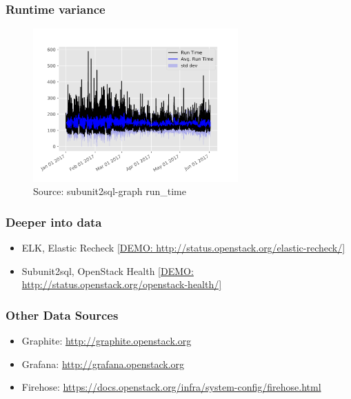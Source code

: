 \documentclass[aspectratio=169,11pt,hyperref={colorlinks=true}]{beamer}
\begin{document}

\begin{frame}
    \frametitle{Runtime variance}
    \begin{figure}
    \begin{center}
    	\includegraphics[width=0.7\textwidth]{runtime_variance.png}
         \caption{Source: subunit2sql-graph run\_time}
    \end{center}
    \end{figure}
\end{frame}


\begin{frame}
    \frametitle{Deeper into data}
    \begin{itemize}
        \item{ELK, Elastic Recheck \href{http://status.openstack.org/elastic-recheck/}{[DEMO: http://status.openstack.org/elastic-recheck/]}}
        \item{Subunit2sql, OpenStack Health \href{http://status.openstack.org/openstack-health/\#/}{[DEMO: http://status.openstack.org/openstack-health/]}}
    \end{itemize}
\end{frame}


\begin{frame}
    \frametitle{Other Data Sources}
    \begin{itemize}
        \item{Graphite: \href{http://graphite.openstack.org}{http://graphite.openstack.org}}
        \item{Grafana: \href{http://grafana.openstack.org}{http://grafana.openstack.org}}
        \item{Firehose: \href{https://docs.openstack.org/infra/system-config/firehose.html}{https://docs.openstack.org/infra/system-config/firehose.html}}
    \end{itemize}
\end{frame}
\end{document}
